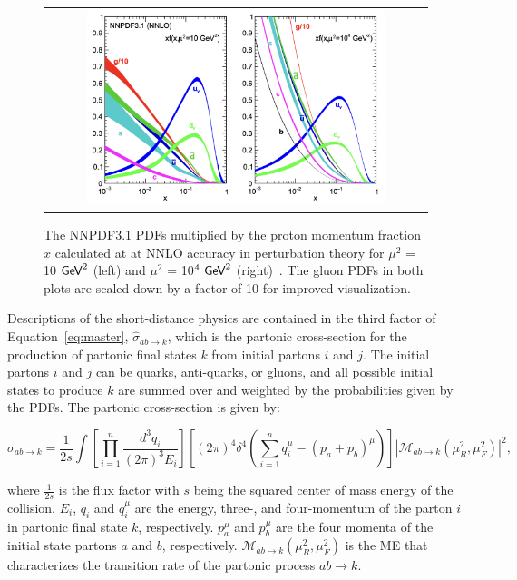 \begin{figure}[tbh!]
 \begin{center}
 \begin{tabular}{c}
 \includegraphics[width=0.8\textwidth]{figures/Part1/QCD/PDF}
 \end{tabular}
 \caption{The NNPDF3.1 \acp{PDF} multiplied by the proton momentum fraction $x$ calculated at at NNLO accuracy in perturbation theory for $\mu^2$ = 10 $\textsf{GeV}^2$ (left) and $\mu^2$ = 10$^4~\textsf{GeV}^2$ (right)~\cite{NNPDF:2017mvq}. The gluon \acp{PDF} in both plots are scaled down by a factor of 10 for improved visualization.}
 \label{fig:PDF}
 \end{center}
\end{figure}

Descriptions of the short-distance physics are contained in the third factor of Equation~\ref{eq:master}, $\hat{\sigma}_{ab\rightarrow k}$, which is the partonic cross-section for the production of partonic final states $k$ from initial partons $i$ and $j$. The initial partons $i$ and $j$ can be quarks, anti-quarks, or gluons, and all possible initial states to produce $k$ are summed over and weighted by the probabilities given by the \acp{PDF}. The partonic cross-section is given by:

\begin{equation}
\hat{\sigma}_{ab\rightarrow k}=\frac{1}{2s}\int[\prod_{i=1}^{n}\frac{d^3q_{i}}{(2\pi)^3E_{i}}][(2\pi)^4\delta^4(\sum_{i=1}^{n}q_{i}^{\mu}-(p_{a}+p_{b})^{\mu})]|\mathcal{M}_{ab\rightarrow k}(\mu_{R}^2,\mu_{F}^2)|^2,
\end{equation}

where $\frac{1}{2s}$ is the flux factor with $s$ being the squared center of mass energy of the collision. $E_{i}$, $q_{i}$ and $q_{i}^{\mu}$ are the energy, three-, and four-momentum of the parton $i$ in partonic final state $k$, respectively. $p_{a}^{\mu}$ and $p_{b}^{\mu}$ are the four momenta of the initial state partons $a$ and $b$, respectively. $\mathcal{M}_{ab\rightarrow k}(\mu_{R}^2,\mu_{F}^2)$ is the \ac{ME} that characterizes the transition rate of the partonic process $ab\rightarrow k$.

